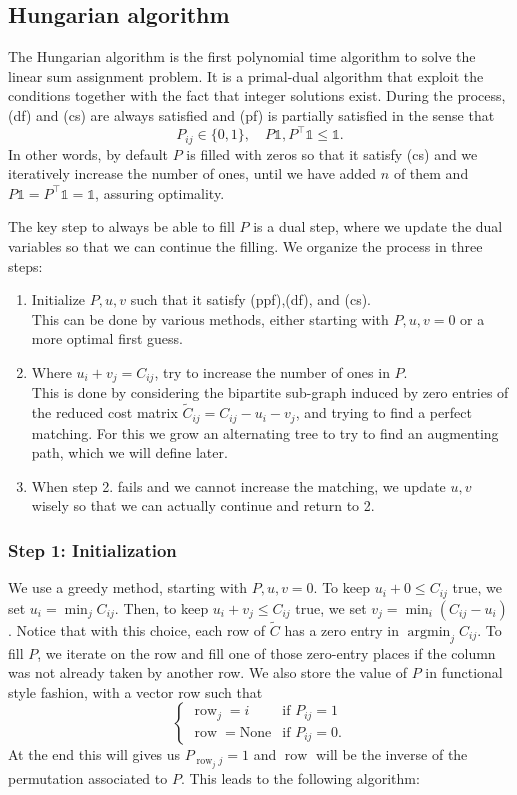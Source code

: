 \documentclass[a4paper]{article}
\theoremstyle{definition}
\theoremstyle{remark}
\DeclareMathOperator*{\argmin}{argmin}
\DeclareMathOperator*{\row}{row}
\newcommand{\un}{\mathds{1}}
\newcommand{\None}{\text{None}}
\begin{document}
\subsection{Hungarian algorithm}
The Hungarian algorithm is the first polynomial time algorithm to solve the linear sum assignment problem. It is a primal-dual algorithm that exploit the  conditions together with the fact that integer solutions exist. During the process, (df) and (cs) are always satisfied and (pf) is partially satisfied in the sense that 
\begin{equation}
     P_{ij}\in \{0,1\},\quad P\un, P^\top\un \leq \un \tag{ppf} \label{eq:ppf}.
\end{equation}
In other words, by default $P$ is filled with zeros so that it satisfy (cs) and we iteratively increase the number of ones, until we have added $n$ of them and $P\un= P^\top\un = \un$, assuring optimality.

The key step to always be able to fill $P$ is a dual step, where we update the dual variables so that we can continue the filling. We organize the process in three steps:
\begin{enumerate}
    \item Initialize $P,u,v$ such that it satisfy (ppf),(df), and (cs). \\
    This can be done by various methods, either starting with $P,u,v=0$ or a more optimal first guess.
    \item Where $u_i+v_j=C_{ij}$, try to increase the number of ones in $P$. \\
    This is done by considering the bipartite sub-graph induced by zero entries of the reduced cost matrix $\tilde{C}_{ij}=C_{ij} - u_i - v_j$, and trying to find a perfect matching. For this we grow an alternating tree to try to find an augmenting path, which we will define later.
    \item When step 2. fails and we cannot increase the matching, we update $u,v$ wisely so that we can actually continue and return to 2.
\end{enumerate}
\subsubsection*{Step 1: Initialization}
We use a greedy method, starting with $P,u,v=0$. To keep $u_i + 0\leq C_{ij}$ true, we set $u_i = \min_j C_{ij}$. Then, to keep $u_i + v_j\leq C_{ij}$ true, we set $v_j = \min_i (C_{ij}-u_i)$. Notice that with this choice, each row of $\tilde{C}$ has a zero entry in $\argmin_j C_{ij}$. To fill $P$, we iterate on the row and fill one of those zero-entry places if the column was not already taken by another row. We also store the value of $P$ in functional style fashion, with a vector row such that 
$$\begin{cases}
    \row_j=i & \text{if } P_{ij}=1 \\
    \row=\None & \text{if } P_{ij}=0.
\end{cases}$$
At the end this will gives us $P_{{\row_j}j}=1$ and $\row$ will be the inverse of the permutation associated to $P$. This leads to the following algorithm:
\end{document}

